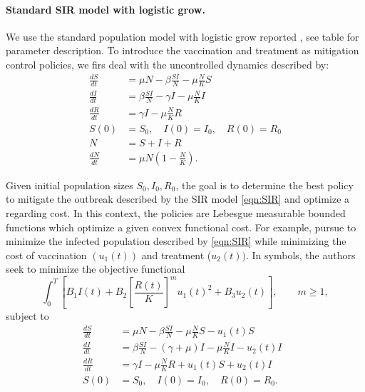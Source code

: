 \paragraph{Standard SIR model with logistic grow.}
We use the standard population model with logistic grow reported
\cite{Schaefer2009}, see table for parameter description. To introduce the 
vaccination and treatment as mitigation control policies, we firs deal with the
uncontrolled dynamics described by:
\begin{equation}\label{eqn:SIR}
	\begin{aligned}
		\frac{dS}{dt} &=
			\mu N  
			- \beta \frac{S I}{N} 
			- \mu \frac{N}{K} S 
		\\
		\frac{dI}{dt} &=
			\beta \frac{S I}{N}
			- \gamma I
			- \mu \frac{N}{K} I
		\\
		\frac{dR}{dt} &= 
			\gamma I 
			- \mu \frac{N}{K} R 
		\\
		S(0) &= S_0, \quad
		I(0) = I_0, \quad
		R(0) = R_0
		\\
		N &= S + I +R
		\\
		\frac{dN}{dt} &=
			\mu N 
			\left(
				1 - \frac{N}{K}
			\right).
	\end{aligned}
\end{equation}

Given initial population sizes $S_0, I_0, R_0$, the goal is to determine the best policy to
mitigate the outbreak described by the SIR model \eqref{eqn:SIR} and optimize a regarding  cost. In this context, the policies are Lebesgue measurable bounded functions
which optimize a given convex functional cost. For example, \citeauthor{Schaefer2009} pursue to minimize the infected population described by \eqref{eqn:SIR} while minimizing the cost of vaccination $(u_1(t))$ and treatment ($u_2(t))$. In symbols, the authors seek to minimize the objective functional
\begin{equation}
	\int_{0}^T	
		\left[
			B_1 I(t) 
			+ B_2 \left[\frac{R(t)}{K}\right]^m u_1(t)^2 + B_3 u_2(t)
		\right],
		\qquad  m\geq 1,
\end{equation}
subject to
\begin{equation}
	\begin{aligned}
		\frac{dS}{dt} &=
			\mu N  
			- \beta \frac{S I}{N} 
			- \mu \frac{N}{K} S - u_1(t) S
		\\
		\frac{dI}{dt} &=
			\beta \frac{S I}{N}
			- (\gamma  + \mu) I 
			- \mu \frac{N}{K} I
			- u_2(t) I
		\\
		\frac{dR}{dt} &= 
			\gamma I 
			- \mu \frac{N}{K} R 
			+ u_1(t) S 
			+ u_2(t) I
		\\
		S(0) &= S_0, \quad
		I(0) = I_0, \quad
		R(0) = R_0. \quad
	\end{aligned}
\end{equation}